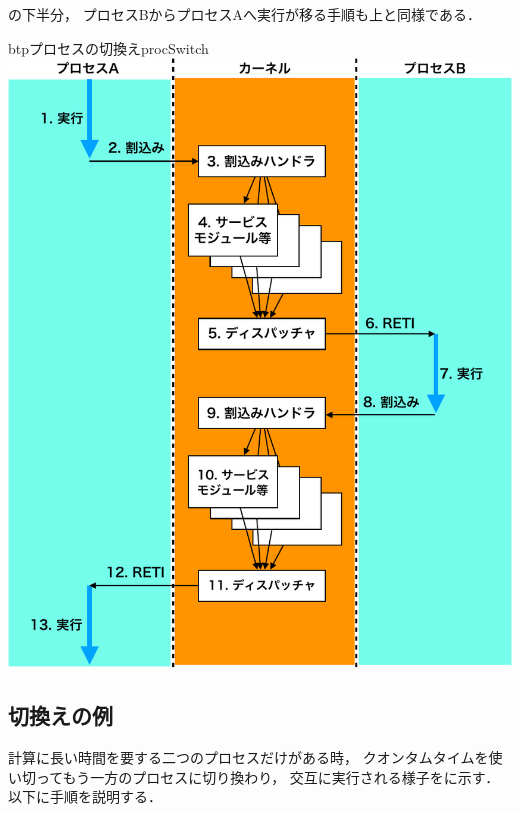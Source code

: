 の下半分，
プロセスBからプロセスAへ実行が移る手順も上と同様である．

\begin{myfig}{btp}{プロセスの切換え}{procSwitch}
  \includegraphics[scale=0.6]{Fig/procSwitch-crop.pdf}
\end{myfig}

\subsection{切換えの例}
計算に長い時間を要する二つのプロセスだけがある時，
クオンタムタイムを使い切ってもう一方のプロセスに切り換わり，
交互に実行される様子をに示す．
以下に手順を説明する．

